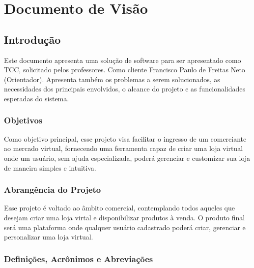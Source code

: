 \documentclass[a4paper,12pt]{monografia}
\begin{document}


\appendix
\newpage
{}
{}  
\chapter{Documento de Visão}
\label{ap:documento_visao}
\section{Introdução} %
\label{sec:Introducao}

Este documento apresenta uma solução de software para ser apresentado como TCC, solicitado pelos professores. Como cliente Francisco Paulo de Freitas Neto (Orientador). Apresenta também os problemas a serem solucionados, as necessidades dos principais envolvidos, o alcance do projeto e as funcionalidades esperadas do sistema.

\subsection{Objetivos} %
\label{sec:objetivos}

Como objetivo principal, esse projeto visa facilitar o ingresso de um comerciante ao mercado virtual, fornecendo uma ferramenta capaz de criar uma loja virtual onde um usuário, sem ajuda especializada, poderá gerenciar e customizar sua loja de maneira simples e intuitiva.


\subsection{Abrangência do Projeto} %
\label{sec:abrengencia_do_projeto}

Esse projeto é voltado ao âmbito comercial, contemplando todos aqueles que desejam criar uma loja virtal e disponibilizar produtos à venda.
O produto final será uma plataforma onde qualquer usuário cadastrado poderá criar, gerenciar e personalizar uma loja virtual.


\subsection{Definições, Acrônimos e Abreviações} %
\label{sec:siglas}
\end{document}
